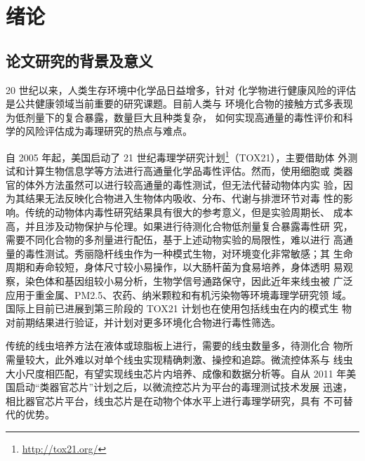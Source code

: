 
\chapter{绪论}
\label{chap:intro}

\section{论文研究的背景及意义}
\label{sec:intro:analog}
	20 世纪以来，人类生存环境中化学品日益增多，针对
	化学物进行健康风险的评估是公共健康领域当前重要的研究课题。目前人类与
	环境化合物的接触方式多表现为低剂量下的复合暴露，数量巨大且种类复杂，
	如何实现高通量的毒性评价和科学的风险评估成为毒理研究的热点与难点。
	
		自 2005 年起，美国启动了 21 世纪毒理学研究计划\footnote{\url{http://tox21.org/}}（TOX21），主要借助体
	外测试和计算生物信息学等方法进行高通量化学品毒性评估。然而，使用细胞或
	类器官的体外方法虽然可以进行较高通量的毒性测试，但无法代替动物体内实
	验，因为其结果无法反映化合物进入生物体内吸收、分布、代谢与排泄环节对毒
	性的影响。传统的动物体内毒性研究结果具有很大的参考意义，但是实验周期长、
	成本高，并且涉及动物保护与伦理。如果进行待测化合物低剂量复合暴露毒性研
	究，需要不同化合物的多剂量进行配伍，基于上述动物实验的局限性，难以进行
	高通量的毒性测试。秀丽隐杆线虫作为一种模式生物，对环境变化非常敏感；其
	生命周期和寿命较短，身体尺寸较小易操作，以大肠杆菌为食易培养，身体透明
	易观察，染色体和基因组较小易分析，生物学信号通路保守，因此近年来线虫被
	广泛应用于重金属、PM2.5、农药、纳米颗粒和有机污染物等环境毒理学研究领
	域\cite{Soares2017Neurodegeneration,Wu2017Coal,Ana2010Genome,Lucio2017Optimization,Wang2017Mitochondria}。
	国际上目前已进展到第三阶段的 TOX21 计划也在使用包括线虫在内的模式生
	物对前期结果进行验证，并计划对更多环境化合物进行毒性筛选。
	
		传统的线虫培养方法在液体或琼脂板上进行，需要的线虫数量多，待测化合
	物所需量较大，此外难以对单个线虫实现精确刺激、操控和追踪。微流控体系与
	线虫大小尺度相匹配，有望实现线虫芯片内培养、成像和数据分析等。自从 2011
	年美国启动“类器官芯片”计划之后，以微流控芯片为平台的毒理测试技术发展
	迅速，相比器官芯片平台，线虫芯片是在动物个体水平上进行毒理学研究，具有
	不可替代的优势。
	
